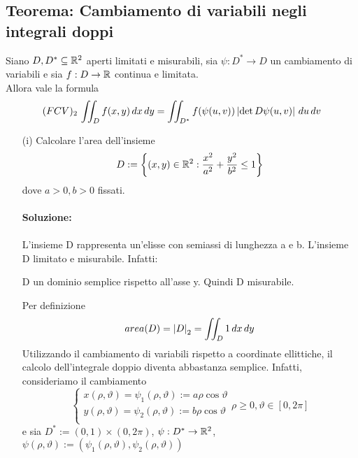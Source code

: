 \subsection{Teorema: Cambiamento di variabili negli integrali doppi}
\begin{theorem}
  Siano $D, D^* \subseteq \mathbb{R}^2$ aperti limitati e misurabili, sia $\psi : D^* \to D$
  un cambiamento di variabili e sia $f:D \to \mathbb{R}$ continua e limitata. \\
  Allora vale la formula
  $$(FCV)_2 \, \iint_{D} f(x,y) \,dx\,dy = \iint_{D^*} f(\psi(u,v))\left\lvert \det D\psi(u,v) \right\rvert \,du\,dv$$ 
\end{theorem}
\begin{exercise}
  \begin{itemize}
    \item[(i)] Calcolare l'area dell'insieme 
               $$D:=\left\{(x,y)\in\mathbb{R}^2:\frac{x^2}{a^2}+\frac{y^2}{b^2} \leq 1\right\}$$
               dove $a>0, b>0$ fissati. \\\\
               \textbf{Soluzione:} \\\\
               L'insieme D rappresenta un'elisse con semiassi di lunghezza a e b. L'insieme D \ace 
               limitato e misurabile. Infatti:
               \begin{exercise}
                 D \ace un dominio semplice rispetto all'asse y. Quindi D \ace misurabile.
               \end{exercise}
               Per definizione $$area(D) = \left\lvert D \right\rvert_2 = \iint_{D} 1 \,dx\,dy$$
               Utilizzando il cambiamento di variabili rispetto a coordinate ellittiche, il calcolo
               dell'integrale doppio diventa abbastanza semplice. Infatti, consideriamo il cambiamento
               $$\left\{\begin{array}{l}
                 x(\rho,\vartheta) = \psi_1(\rho,\vartheta):= a\rho\cos\vartheta \\
                 y(\rho,\vartheta) = \psi_2(\rho,\vartheta):= b\rho\cos\vartheta \\
               \end{array}\right. \rho \geq 0, \vartheta \in [0,2\pi]$$
               e sia $D^* := (0,1)\times (0,2\pi)$, $\psi : D^* \to \mathbb{R}^2$, 
               $\psi(\rho,\vartheta):=\left(\psi_1(\rho,\vartheta), \psi_2(\rho,\vartheta)\right)$
               \begin{exercise}

\end{exercise}
\end{itemize}
\end{exercise}
